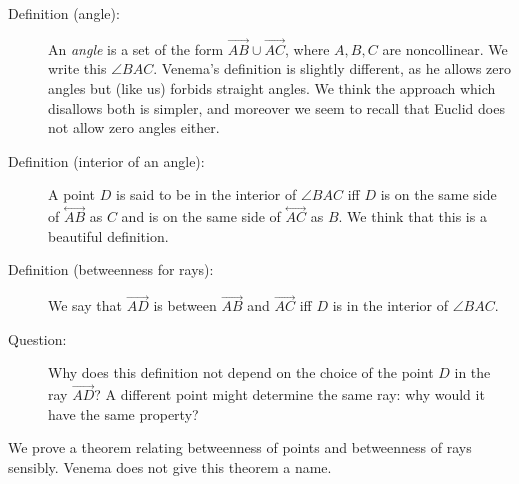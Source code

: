 \documentclass[12pt]{article}
\newcommand\Line[1]{\overset{\leftrightarrow}{#1}}
\begin{document}
\begin{description}

\item[Definition (angle):]  An {\em angle\/} is a set of the form $\overrightarrow{AB} \cup \overrightarrow{AC}$, where $A,B,C$ are noncollinear.  We write this $\angle BAC$.  Venema's definition is slightly different, as he allows zero angles but (like us) forbids straight angles.  We think the approach which disallows both is simpler, and moreover we seem to recall that Euclid does not allow zero angles either.

\item[Definition (interior of an angle):]  A point $D$ is said to be in the interior of $\angle BAC$ iff $D$ is on the same side of $\Line{AB}$ as $C$ and is on the same side of $\Line{AC}$ as $B$.  We think that this is a beautiful definition.

\item[Definition (betweenness for rays):]  We say that $\overrightarrow{AD}$ is between $\overrightarrow{AB}$ and $\overrightarrow{AC}$ iff $D$ is in the interior of $\angle BAC$.

\item[Question:]  Why does this definition not depend on the choice of the point $D$ in the ray $\overrightarrow{AD}$?  A different point might determine the same ray:  why would it have the same property?

\end{description}

We prove a theorem relating betweenness of points and betweenness of rays sensibly.  Venema does not give this theorem a name.
\end{document}
